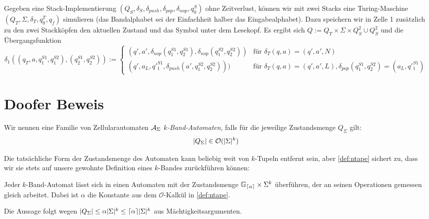 \documentclass{article}
\begin{document}
\begin{beispiel}
    Gegeben eine Stack-Implementierung $(Q_S, \delta_S, \delta_{push}, \delta_{pop}, \delta_{nop}, q^S_0)$ ohne Zeitverlust, können wir mit zwei Stacks eine Turing-Maschine $(Q_T, \Sigma, \delta_T, q^T_0, q_f)$ simulieren (das Bandalphabet sei der Einfachheit halber das Eingabealphabet). Dazu speichern wir in Zelle 1 zusätzlich zu den zwei Stackköpfen den aktuellen Zustand und das Symbol unter dem Lesekopf. Es ergibt sich $Q := Q_T \times \Sigma \times Q^2_S \cup Q^2_S$ und die Übergangsfunktion
    \[ \delta_1((q_T, a, q^{S1}_1, q^{S2}_1), (q^{S1}_2, q^{S2}_2)) :=
    \begin{cases}
        (q', a', \delta_{nop}(q^{S1}_1, q^{S1}_2), \delta_{nop}(q^{S2}_1, q^{S2}_2)) &\text{für } \delta_T(q, a) = (q', a', N) \\
        (q', a_L, q'^{S1}_1, \delta_{push}(a', q^{S2}_1, q^{S2}_2))) &\text{für } \delta_T(q, a) = (q', a', L), \delta_{pop}(q^{S1}_1, q^{S2}_2) = (a_L, q'^{S1}_1)
    \end{cases} \]
\end{beispiel}

\section{Doofer Beweis}

\begin{definition}
    Wir nennen eine Familie von Zellularautomaten $\mathcal{A}_\Sigma$ \emph{$k$-Band-Automaten}, falls für die jeweilige Zustandsmenge $Q_\Sigma$ gilt:
    \begin{equation}
        \lvert Q_\Sigma\rvert \in \mathcal{O}(\lvert\Sigma\rvert^k) \label{def:ntape}
    \end{equation}
\end{definition}

Die tatsächliche Form der Zustandsmenge des Automaten kann beliebig weit von $k$-Tupeln entfernt sein, aber \eqref{def:ntape} sichert zu, dass wir sie stets auf unsere gewohnte Definition eines $k$-Bandes zurückführen können:

\begin{satz}
    \label{thm:tape-hom}
    Jeder $k$-Band-Automat lässt sich in einen Automaten mit der Zustandsmenge $\mathbb{G}_{\lceil\alpha\rceil} \times \Sigma^k$ überführen, der an seinen Operationen gemessen gleich arbeitet. Dabei ist $\alpha$ die Konstante aus dem $\mathcal{O}$-Kalkül in \eqref{def:ntape}.

    \begin{beweis}
        Die Aussage folgt wegen $\lvert Q_\Sigma\rvert \leq \alpha \lvert\Sigma\rvert^k \leq \lceil\alpha\rceil \lvert\Sigma\rvert^k$ aus Mächtigkeitsargumenten.
    \end{beweis}
\end{satz}
\end{document}
